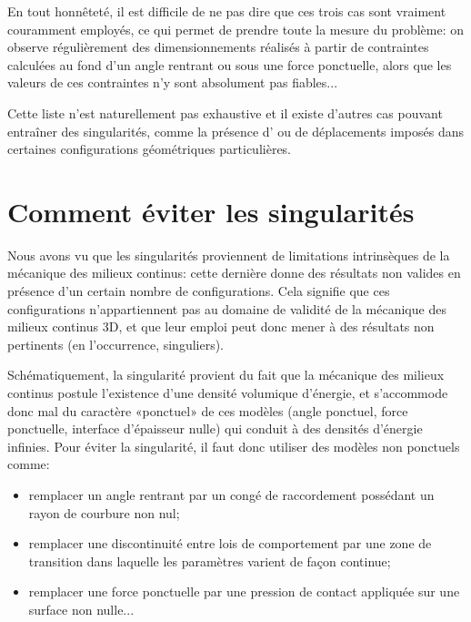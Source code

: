 \medskip
En tout honnêteté, il est difficile de ne pas dire que ces trois cas sont vraiment couramment
employés, ce qui permet de prendre toute la mesure du problème: on observe régulièrement des
dimensionnements réalisés à partir de contraintes calculées au fond d'un angle rentrant ou sous
une force ponctuelle, alors que les valeurs de ces contraintes n'y sont absolument pas fiables...

Cette liste n'est naturellement pas exhaustive et il existe d'autres cas pouvant entraîner des
singularités, comme la présence d' ou de déplacements imposés
dans certaines configurations géométriques particulières.


\medskip
\section{Comment éviter les singularités}

Nous avons vu que les singularités proviennent de limitations intrinsèques de la mécanique des
milieux continus: cette dernière donne des résultats non valides en présence d'un certain
nombre de configurations. Cela signifie que ces configurations n'appartiennent
pas au domaine de validité de la mécanique des milieux continus 3D, et que leur emploi peut
donc mener à des résultats non pertinents (en l'occurrence, singuliers).

\medskip
Schématiquement, la singularité provient du fait que la mécanique des milieux continus postule
l'existence d'une densité volumique d'énergie, et s'accommode donc mal du caractère
«ponctuel» de ces modèles (angle ponctuel, force ponctuelle, interface d'épaisseur nulle) qui
conduit à des densités d'énergie infinies. Pour éviter la singularité, il faut donc utiliser des
modèles non ponctuels comme:
\begin{itemize}
  \item remplacer un angle rentrant par un congé de raccordement possédant un rayon de courbure
	non nul;
  \item remplacer une discontinuité entre lois de comportement par une zone de transition dans
	laquelle les paramètres varient de façon continue;
  \item remplacer une force ponctuelle par une pression de contact appliquée sur une surface non
	nulle...
\end{itemize}

